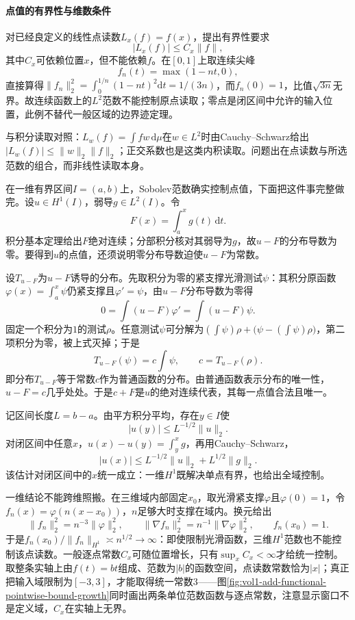 \paragraph{点值的有界性与维数条件}

对已经良定义的线性点读数$L_x(f)=f(x)$，提出有界性要求
\[
|L_x(f)|\le C_x\|f\|,
\]
其中$C_x$可依赖位置$x$，但不能依赖$f$。在$[0,1]$上取连续尖峰
\[
f_n(t)=\max(1-nt,0),
\]
直接算得$\|f_n\|_2^2=\int_0^{1/n}(1-nt)^2\mathrm dt=1/(3n)$，而$f_n(0)=1$，比值$\sqrt{3n}$无界。故连续函数上的$L^2$范数不能控制原点读取；零点是闭区间中允许的输入位置，此例不替代一般区域的边界迹定理。

与积分读取对照：$L_w(f)=\int fw\,\mathrm d\mu$在$w\in L^2$时由Cauchy–Schwarz给出$|L_w(f)|\le\|w\|_2\|f\|_2$；正交系数也是这类内积读取。问题出在点读数与所选范数的组合，而非线性读取本身。

在一维有界区间$I=(a,b)$上，Sobolev范数确实控制点值，下面把这件事完整做完。设$u\in H^1(I)$，弱导$g\in L^2(I)$。令
\[
F(x)=\int_a^x g(t)\,\mathrm dt.
\]
积分基本定理给出$F$绝对连续；分部积分核对其弱导为$g$，故$u-F$的分布导数为零。要得到$u$的点值，还须说明零分布导数迫使$u-F$为常数。

设$T_{u-F}$为$u-F$诱导的分布。先取积分为零的紧支撑光滑测试$\psi$：其积分原函数$\varphi(x)=\int_a^x\psi$仍紧支撑且$\varphi'=\psi$，由$u-F$分布导数为零得
\[
0=\int(u-F)\varphi'=\int(u-F)\psi.
\]
固定一个积分为$1$的测试$\rho$。任意测试$\psi$可分解为$(\int\psi)\rho+\bigl(\psi-(\int\psi)\rho\bigr)$，第二项积分为零，被上式灭掉；于是
\[
T_{u-F}(\psi)=c\int\psi,\qquad c=T_{u-F}(\rho).
\]
即分布$T_{u-F}$等于常数$c$作为普通函数的分布。由普通函数表示分布的唯一性，$u-F=c$几乎处处。于是$c+F$是$u$的绝对连续代表，其每一点值合法且唯一。

记区间长度$L=b-a$。由平方积分平均，存在$y\in I$使
\[
|u(y)|\le L^{-1/2}\|u\|_2.
\]
对闭区间中任意$x$，$u(x)-u(y)=\int_y^x g$，再用Cauchy–Schwarz，
\begin{equation}
\label{eq:functional-point-evaluation-embed}
|u(x)|\le L^{-1/2}\|u\|_2+L^{1/2}\|g\|_2.
\end{equation}
该估计对闭区间中的$x$统一成立：一维$H^1$既解决单点有界，也给出全域控制。

一维结论不能跨维照搬。在三维域内部固定$x_0$，取光滑紧支撑$\varphi$且$\varphi(0)=1$，令$f_n(x)=\varphi(n(x-x_0))$，$n$足够大时支撑在域内。换元给出
\[
\|f_n\|_2^2=n^{-3}\|\varphi\|_2^2,\qquad
\|\nabla f_n\|_2^2=n^{-1}\|\nabla\varphi\|_2^2,\qquad
f_n(x_0)=1.
\]
于是$f_n(x_0)/\|f_n\|_{H^1}\asymp n^{1/2}\to\infty$：即使限制光滑函数，三维$H^1$范数也不能控制该点读数。一般逐点常数$C_x$可随位置增长，只有$\sup_xC_x<\infty$才给统一控制。取整条实轴上由$f(t)=bt$组成、范数为$|b|$的函数空间，点读数常数恰为$|x|$；真正把输入域限制为$[-3,3]$，才能取得统一常数$3$——图\ref{fig:vol1-add-functional-pointwise-bound-growth}同时画出两条单位范数函数与逐点常数，注意显示窗口不是定义域，$C_x$在实轴上无界。

